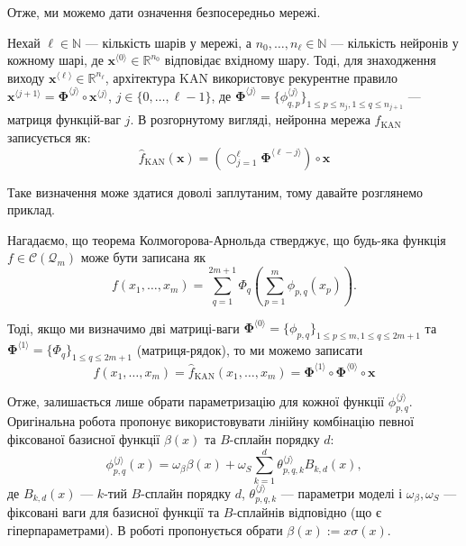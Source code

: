 Отже, ми можемо дати означення безпосередньо мережі.
\begin{definition}
	Нехай $\ell \in \mathbb{N}$ --- кількість шарів у мережі, а
	$n_0,\dots,n_{\ell} \in \mathbb{N}$ --- кількість нейронів у кожному шарі,
	де $\mathbf{x}^{\langle 0 \rangle} \in \mathbb{R}^{n_0}$ відповідає вхідному
	шару. Тоді, для знаходження виходу $\mathbf{x}^{\langle \ell \rangle} \in
	\mathbb{R}^{n_{\ell}}$, архітектура KAN використовує рекурентне правило
	$\mathbf{x}^{\langle j+1 \rangle} = \boldsymbol{\Phi}^{\langle j \rangle}
	\circ \mathbf{x}^{\langle j \rangle}$, $j \in \{0,\dots,\ell-1\}$, де
	$\boldsymbol{\Phi}^{\langle j \rangle} =
	\{\phi^{\langle j \rangle}_{q,p}\}_{1\leq p\leq n_j, 1 \leq q \leq
	n_{j+1}}$ --- матриця функцій-ваг $j$. В розгорнутому вигляді, нейронна мережа $\widehat{f}_{\text{KAN}}$ записується як:
	\begin{equation*}
		\widehat{f}_{\text{KAN}}(\mathbf{x}) = \left(\bigcirc_{j=1}^{\ell}\boldsymbol{\Phi}^{\langle \ell - j \rangle}\right)\circ \mathbf{x}
	\end{equation*}
\end{definition}

Таке визначення може здатися доволі заплутаним, тому давайте розглянемо приклад.

\begin{example}
	Нагадаємо, що теорема Колмогорова-Арнольда стверджує, що будь-яка функція 
	$f \in \mathcal{C}(\mathcal{Q}_m)$ може бути записана як
	\begin{equation*}
		f(x_1,\dots,x_m) = \sum_{q=1}^{2m+1}\Phi_q\left(\sum_{p=1}^m \phi_{p,q}(x_p)\right).
	\end{equation*}

	Тоді, якщо ми визначимо дві матриці-ваги $\boldsymbol{\Phi}^{\langle 0 \rangle} = \{\phi_{p,q}\}_{1 \leq p \leq m, 1 \leq q \leq 2m+1}$ та
	$\boldsymbol{\Phi}^{\langle 1 \rangle} = \{\Phi_q\}_{1 \leq q \leq 2m+1}$ (матриця-рядок), то ми можемо записати
	\begin{equation*}
		f(x_1,\dots,x_m) = \widehat{f}_{\text{KAN}}(x_1,\dots,x_m) = \boldsymbol{\Phi}^{\langle 1 \rangle} \circ \boldsymbol{\Phi}^{\langle 0 \rangle} \circ \mathbf{x}
	\end{equation*}
\end{example}

Отже, залишається лише обрати параметризацію для кожної функції
$\phi_{p,q}^{\langle j \rangle}$. Оригінальна робота \cite{kan} пропонує 
використовувати лінійну комбінацію певної фіксованої базисної функції $\beta(x)$ та $B$-сплайн порядку $d$:
\begin{equation*}
	\phi_{p,q}^{\langle j \rangle}(x) = \omega_{\beta} \beta(x) + \omega_S\sum_{k=1}^{d} \theta_{p,q,k}^{\langle j \rangle} B_{k,d}(x),
\end{equation*}
де $B_{k,d}(x)$ --- $k$-тий $B$-сплайн порядку $d$, $\theta_{p,q,k}^{\langle j
\rangle}$ --- параметри моделі і $\omega_{\beta},\omega_S$ --- фіксовані ваги
для базисної функції та $B$-сплайнів відповідно (що є гіперпараметрами). В
роботі пропонується обрати $\beta(x) := x\sigma(x)$. 


